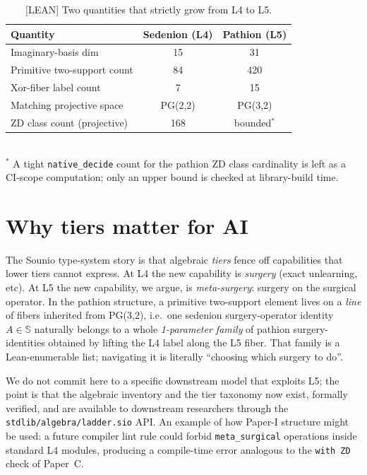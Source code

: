 \documentclass{article}
\begin{document}
\begin{table}[h]
  \centering
  \caption{[LEAN] Two quantities that strictly grow from L4 to L5.}
  \label{tbl:growth}
  \begin{tabular}{lcc}
    \toprule
    Quantity                   & Sedenion (L4) & Pathion (L5) \\
    \midrule
    Imaginary-basis dim        & 15            & 31           \\
    Primitive two-support count & 84            & 420          \\
    Xor-fiber label count       & 7             & 15           \\
    Matching projective space  & PG(2,2)       & PG(3,2)      \\
    ZD class count (projective) & 168           & bounded$^*$  \\
    \bottomrule
  \end{tabular}\\
  \footnotesize
  $^*$ A tight \texttt{native\_decide} count for the pathion ZD
  class cardinality is left as a CI-scope computation; only an
  upper bound is checked at library-build time.
\end{table}

\section{Why tiers matter for AI}

The Sounio type-system story is that algebraic \emph{tiers} fence
off capabilities that lower tiers cannot express.  At L4 the new
capability is \emph{surgery} (exact unlearning, etc).  At L5 the
new capability, we argue, is \emph{meta-surgery}: surgery on the
surgical operator.  In the pathion structure, a primitive
two-support element lives on a \emph{line} of fibers inherited from
PG(3,2), i.e.\ one sedenion surgery-operator identity $A \in \mathbb S$
naturally belongs to a whole \emph{1-parameter family} of pathion
surgery-identities obtained by lifting the L4 label along the L5
fiber.  That family is a Lean-enumerable list; navigating it is
literally ``choosing which surgery to do''.

We do not commit here to a specific downstream model that exploits
L5; the point is that the algebraic inventory and the tier taxonomy
now exist, formally verified, and are available to downstream
researchers through the \texttt{stdlib/algebra/ladder.sio} API.  An
example of how Paper-I structure might be used: a future compiler
lint rule could forbid \texttt{meta\_surgical} operations inside
standard L4 modules, producing a compile-time error analogous to
the \texttt{with ZD} check of Paper~C.
\end{document}
